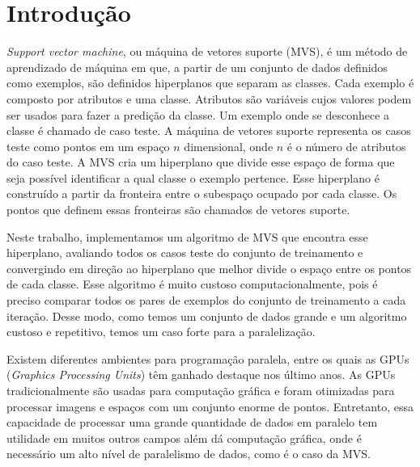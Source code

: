 \chapter{Introdução}\label{chp:LABEL_CHP_1}

\emph{Support vector machine}, ou máquina de vetores suporte (MVS), é um método de aprendizado de máquina em que, a partir de um conjunto de dados definidos como exemplos, são definidos hiperplanos que separam as classes. Cada exemplo é composto por atributos e uma classe. Atributos são variáveis cujos valores podem ser usados para fazer a predição da classe. Um exemplo onde se desconhece a classe é chamado de caso teste. A máquina de vetores suporte representa os casos teste como pontos em um espaço $n$ dimensional, onde $n$ é o número de atributos do caso teste. A MVS cria um hiperplano que divide esse espaço de forma que seja possível identificar a qual classe o exemplo pertence.
Esse hiperplano é construído a partir da fronteira entre o subespaço ocupado por cada classe. Os pontos que definem essas fronteiras são chamados de vetores suporte.

Neste trabalho, implementamos um algoritmo de MVS que encontra esse hiperplano, avaliando todos os casos teste do conjunto de treinamento e convergindo em direção ao hiperplano que melhor divide o espaço entre os pontos de cada classe. Esse algoritmo é muito custoso computacionalmente, pois é preciso comparar todos os pares de exemplos do conjunto de treinamento a cada iteração.
Desse modo, como temos um conjunto de dados grande e um algoritmo custoso e repetitivo, temos um caso forte para a paralelização.


\par
Existem diferentes ambientes para programação paralela, entre os quais as GPUs (\emph{Graphics Processing Units}) têm ganhado destaque nos último anos. As GPUs tradicionalmente são usadas para computação gráfica e foram otimizadas para processar imagens e espaços com um conjunto enorme de pontos. Entretanto, essa capacidade de processar uma grande quantidade de dados em paralelo tem utilidade em muitos outros campos além dá computação gráfica, onde é necessário um alto nível de paralelismo de dados, como é o caso da MVS.

